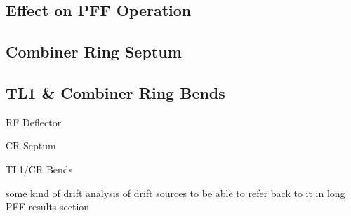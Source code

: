 \subsection{Effect on PFF Operation}
\label{ss:t566EffectPFF}



\subsection{Combiner Ring Septum}
\label{ss:crSeptum}

\subsection{TL1 \& Combiner Ring Bends}
\label{ss:crBends}


RF Deflector

CR Septum

TL1/CR Bends



some kind of drift analysis of drift sources to be able to refer back to it in long PFF results section



